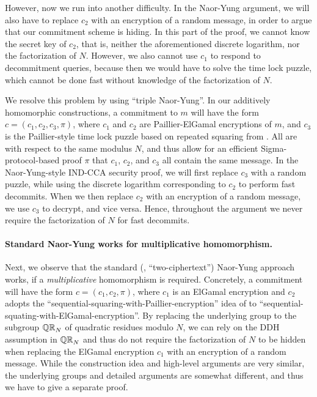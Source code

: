However, now we run into another difficulty. In the Naor-Yung argument, we will also have to replace $c_2$ with an encryption of a random message, in order to argue that our commitment scheme is hiding. In this part of the proof, we cannot know the secret key of $c_2$, that is, neither the aforementioned discrete logarithm, nor the factorization of $N$. However, we also cannot use $c_1$ to respond to decommitment queries, because then we would have to solve the time lock puzzle, which cannot be done fast without knowledge of the factorization of $N$.

We resolve this problem by using ``triple Naor-Yung''. In our additively homomorphic constructions, a commitment to $m$ will have the form $c = (c_1, c_2, c_3, \pi)$, where $c_1$ and $c_2$ are Paillier-ElGamal encryptions of $m$, and $c_3$ is the Paillier-style time lock puzzle based on repeated squaring from \cite{C:MalThy19}. All are with respect to the same modulus $N$, and thus allow for an efficient Sigma-protocol-based proof $\pi$ that $c_1$, $c_2$, and $c_3$ all contain the same message. In the Naor-Yung-style IND-CCA security proof, we will first replace $c_3$ with a random puzzle, while using the discrete logarithm corresponding to $c_2$ to perform fast decommits. When we then replace $c_2$ with an encryption of a random message, we use $c_3$ to decrypt, and vice versa. Hence, throughout the argument we never require the factorization of $N$ for fast decommits.


\paragraph{Standard Naor-Yung works for multiplicative homomorphism.}
Next, we observe that the standard (\ie, ``two-ciphertext'') Naor-Yung approach works, if a \emph{multiplicative} homomorphism is required. Concretely, a commitment will have the form $c = (c_1, c_2, \pi)$, where $c_1$ is an ElGamal encryption and $c_2$ adopts the ``sequential-squaring-with-Paillier-encryption'' idea of \cite{C:MalThy19} to ``sequential-squating-with-ElGamal-encryption''. By replacing the underlying group to the subgroup $\mathbb{QR}_N$ of quadratic residues modulo $N$, we can rely on the DDH assumption in $\mathbb{QR}_N$ and thus do not require the factorization of $N$ to be hidden when replacing the ElGamal encryption $c_1$ with an encryption of a random message.
While the construction idea and high-level arguments are very similar, the underlying groups and detailed arguments are somewhat different, and thus we have to give a separate proof.




